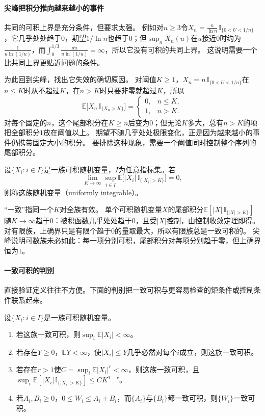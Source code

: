 \paragraph{尖峰把积分推向越来越小的事件}
共同的可积上界是充分条件，但要求太强。
例如对$n\geq3$令$X_n=\frac{n}{\ln n}\,\mathbb I_{\{0<U<1/n\}}$，它几乎处处趋于$0$，期望$1/\ln n$也趋于$0$；但$\sup_nX_n(u)$在$u$接近$0$时约为$\frac{1}{u\ln(1/u)}$，而$\int_0^{1/3}\frac{du}{u\ln(1/u)}=\infty$，所以它没有可积的共同上界。
这说明需要一个比共同上界更贴近问题的条件。

为此回到尖峰，找出它失效的确切原因。
对阈值$K\geq1$，$X_n=n\,\mathbb I_{\{0<U<1/n\}}$在$n\leq K$时从不超过$K$，在$n>K$时只要非零就超过$K$，所以
\[
  \mathbb E\bigl[X_n\,\mathbb I_{\{X_n>K\}}\bigr]=
  \begin{cases}0,&n\leq K,\\ 1,&n>K.\end{cases}
\]
对每个固定的$n$，这个尾部积分在$K\geq n$后变为$0$；但无论$K$多大，总有$n>K$的项把全部积分$1$放在阈值以上。
期望不随几乎处处极限变化，正是因为越来越小的事件仍携带固定大小的积分。
要排除这种现象，需要一个阈值同时控制整个序列的尾部积分。

\begin{definition}[一致可积]
\label{def:conv-uniform-integrability}
设$\{X_i:i\in I\}$是一族可积随机变量，$I$为任意指标集。若
\[
  \lim_{K\to\infty}\sup_{i\in I}\mathbb E\bigl[|X_i|\,\mathbb I_{\{|X_i|>K\}}\bigr]=0,
\]
则称这族随机变量（uniformly integrable）。
\end{definition}

“一致”指同一个$K$对全族有效。
单个可积随机变量$X$的尾部积分$\mathbb E[|X|\,\mathbb I_{\{|X|>K\}}]$随$K\to\infty$趋于$0$：被积函数几乎处处趋于$0$，且受$|X|$控制，由控制收敛定理即得。对有限族，上确界只是有限个趋于$0$的量取最大，所以有限族总是一致可积的。
尖峰说明可数族未必如此：每一项分别可积，尾部积分对每项分别趋于零，但上确界恒为$1$。

\paragraph{一致可积的判别}
直接验证定义往往不方便。下面的判别把一致可积与更容易检查的矩条件或控制条件联系起来。

\begin{theorem}[一致可积的判别]
\label{thm:conv-ui-criteria}
设$\{X_i:i\in I\}$是一族可积随机变量。
\begin{enumerate}
  \item 若这族一致可积，则$\sup_{i}\mathbb E|X_i|<\infty$。
  \item 若存在$Y\geq0$，$\mathbb EY<\infty$，使$|X_i|\leq Y$几乎必然对每个$i$成立，则这族一致可积。
  \item 若存在$r>1$使$C=\sup_i\mathbb E|X_i|^r<\infty$，则这族一致可积，且$\sup_i\mathbb E[|X_i|\,\mathbb I_{\{|X_i|>K\}}]\leq CK^{1-r}$。
  \item 若$A_i,B_i\geq0$，$0\leq W_i\leq A_i+B_i$，而$\{A_i\}$与$\{B_i\}$都一致可积，则$\{W_i\}$一致可积。
\end{enumerate}
\end{theorem}

